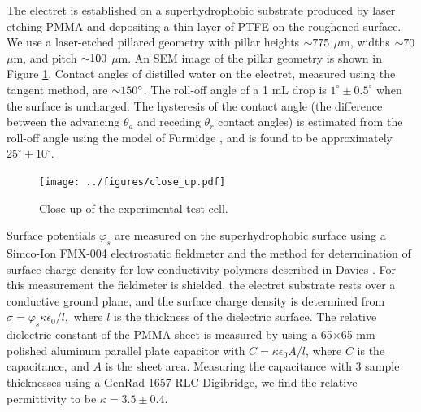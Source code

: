 \documentclass[aip,reprint, floatfix]{revtex4-1}
\begin{document}
The electret is established on a superhydrophobic substrate produced by laser etching PMMA and depositing a thin layer of PTFE on the roughened surface. We use a laser-etched pillared geometry with pillar heights $\sim \hspace{-1mm} 775$ $\mu$m, widths $\sim \hspace{-1mm} 70$ $\mu$m, and pitch $\sim \hspace{-1mm} 100$ $\mu$m. An SEM image of the pillar geometry is shown in Figure \ref{fig:SEM}. Contact angles of distilled water on the electret, measured using the tangent method, are $\sim \hspace{-1mm} 150^{\circ}$. The roll-off angle of a 1 mL drop is $1^{\circ} \pm 0.5^{\circ}$ when the surface is uncharged. The hysteresis of the contact angle (the difference between the advancing $\theta_a$ and receding $\theta_r$ contact angles) is estimated from the roll-off angle using the model of Furmidge \cite{furmidge_studies_1962}, and is found to be approximately $25^{\circ} \pm 10^{\circ}$.

\begin{figure}
    \centering
    \def\svgwidth{\columnwidth}
        \texttt{[image: ../figures/close\_up.pdf]}
    \caption{Close up of the experimental test cell.\label{fig:SEM}}
\end{figure}

Surface potentials $\varphi_s$ are measured on the superhydrophobic surface using a Simco-Ion FMX-004 electrostatic fieldmeter and the method for determination of surface charge density for low conductivity polymers described in Davies \cite{davies_examination_1967}. For this measurement the fieldmeter is shielded, the electret substrate rests over a conductive ground plane, and the surface charge density is determined from $\sigma = \varphi_s \kappa \epsilon_0/l,$ where $l$ is the thickness of the dielectric surface. The relative dielectric constant of the PMMA sheet is measured by using a 65$\times$65 mm polished aluminum parallel plate capacitor with $C = \kappa \epsilon_0 A/l$, where $C$ is the capacitance, and $A$ is the sheet area. Measuring the capacitance with 3 sample thicknesses using a GenRad 1657 RLC Digibridge, we find the relative permittivity to be $\kappa = 3.5 \pm 0.4$.  
\end{document}
